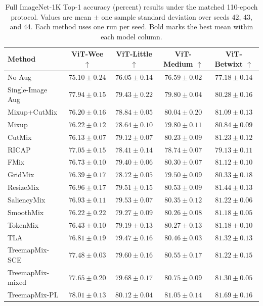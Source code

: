 \begin{table}[!htbp]
  \caption{Full ImageNet-1K Top-1 accuracy (percent) results under the matched 110-epoch protocol. Values are mean $\pm$ one sample standard deviation over seeds 42, 43, and 44. Each method uses one run per seed. Bold marks the best mean within each model column.}
  \label{tab:in1k-full-results-acc}
  \centering
  \footnotesize
  \setlength{\tabcolsep}{4pt}
  \begin{tabular}{@{}lcccc@{}}
    \toprule
    Method & ViT-Wee $\uparrow$ & ViT-Little $\uparrow$ & ViT-Medium $\uparrow$ & ViT-Betwixt $\uparrow$ \\
    \midrule
    No Aug & $75.10 \pm 0.24$ & $76.05 \pm 0.14$ & $76.59 \pm 0.02$ & $77.18 \pm 0.14$ \\
    Single-Image Aug & $77.94 \pm 0.15$ & $79.43 \pm 0.22$ & $79.80 \pm 0.04$ & $80.28 \pm 0.16$ \\
    Mixup+CutMix & $76.20 \pm 0.16$ & $78.84 \pm 0.05$ & $80.04 \pm 0.20$ & $81.09 \pm 0.13$ \\
    Mixup & $76.22 \pm 0.12$ & $78.64 \pm 0.10$ & $79.80 \pm 0.11$ & $80.84 \pm 0.09$ \\
    CutMix & $76.13 \pm 0.07$ & $79.12 \pm 0.07$ & $80.23 \pm 0.09$ & $81.23 \pm 0.12$ \\
    RICAP & $77.05 \pm 0.15$ & $78.41 \pm 0.14$ & $78.74 \pm 0.07$ & $79.13 \pm 0.11$ \\
    FMix & $76.73 \pm 0.10$ & $79.40 \pm 0.06$ & $80.30 \pm 0.07$ & $81.12 \pm 0.10$ \\
    GridMix & $76.39 \pm 0.17$ & $78.72 \pm 0.05$ & $79.50 \pm 0.09$ & $80.33 \pm 0.18$ \\
    ResizeMix & $76.96 \pm 0.17$ & $79.51 \pm 0.15$ & $80.53 \pm 0.09$ & $81.44 \pm 0.13$ \\
    SaliencyMix & $76.93 \pm 0.11$ & $79.53 \pm 0.07$ & $80.35 \pm 0.12$ & $81.22 \pm 0.06$ \\
    SmoothMix & $76.22 \pm 0.22$ & $79.27 \pm 0.09$ & $80.26 \pm 0.08$ & $81.18 \pm 0.05$ \\
    TokenMix & $76.43 \pm 0.10$ & $79.19 \pm 0.13$ & $80.27 \pm 0.13$ & $81.18 \pm 0.10$ \\
    TLA & $76.81 \pm 0.19$ & $79.47 \pm 0.16$ & $80.46 \pm 0.03$ & $81.32 \pm 0.13$ \\
    TreemapMix-SCE & $77.48 \pm 0.03$ & $79.60 \pm 0.16$ & $80.55 \pm 0.17$ & $81.22 \pm 0.15$ \\
    TreemapMix-mixed & $77.65 \pm 0.20$ & $79.68 \pm 0.17$ & $80.75 \pm 0.09$ & $81.30 \pm 0.05$ \\
    TreemapMix-PL & $\mathbf{78.01 \pm 0.13}$ & $\mathbf{80.12 \pm 0.04}$ & $\mathbf{81.05 \pm 0.14}$ & $\mathbf{81.69 \pm 0.16}$ \\
    \bottomrule
  \end{tabular}
\end{table}
